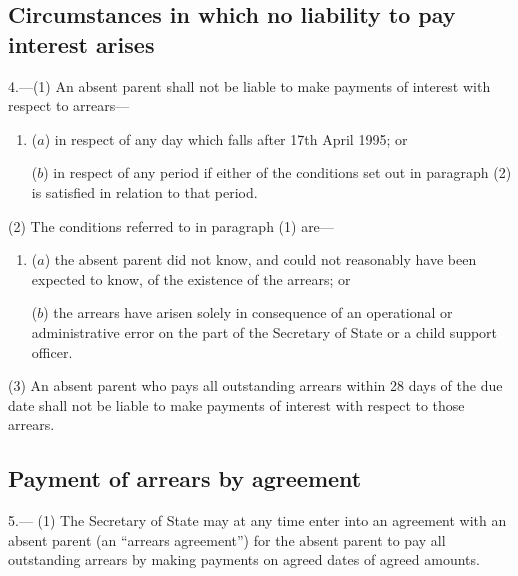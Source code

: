 \documentclass[12pt,a4paper]{article}
\begin{document}
\subsection[4. Circumstances in which no liability to pay interest arises]{Circumstances in which no liability to pay interest arises}

4.—(1) An absent parent shall not be liable to make payments of interest 
with respect to arrears—
\begin{enumerate}\item[]
($a$) in respect of any day which falls after 17th April 1995; or

($b$) in respect of any period if either of the conditions set out in paragraph (2) is satisfied in relation to that period.
\end{enumerate}  %

(2) The conditions referred to in paragraph (1) are—
\begin{enumerate}\item[]
($a$) the absent parent did not know, and could not reasonably have been expected to know, of the existence of the arrears; or

($b$) the arrears have arisen solely in consequence of an operational or administrative error on the part of the Secretary of State or a child support officer.
\end{enumerate}

(3) An absent parent who pays all outstanding arrears 
within 28 days of the due date shall not be liable to make payments of interest with respect to those arrears.


\subsection[5. Payment of arrears by agreement]{Payment of arrears by agreement}

5.—%
%
(1) The Secretary of State may at any time enter into an agreement with an absent parent (an “arrears agreement”) for the absent parent to pay all outstanding arrears by making payments on agreed dates of agreed amounts.
\end{document}
